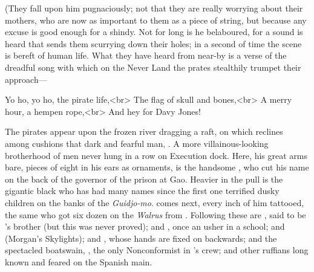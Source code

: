 \begin{stagedir}
(They fall upon him pugnaciously;
not that they are really worrying about their mothers, who are now as important to them as a piece of string,
but because any excuse is good enough for a shindy.
Not for long is he belaboured, for a sound is heard that sends them scurrying down their holes; in a second of time the scene is bereft of human life.
What they have heard from near-by is a verse of the dreadful song with which on the Never Land the prates stealthily trumpet their approach—

\begin{drama}
\speakercontinues
Yo ho, yo ho, the pirate life,<br>
The flag of skull and bones,<br>
A merry hour, a hempen rope,<br>
And hey for Davy Jones!
\end{drama}

The pirates appear upon the frozen river dragging a raft,
on which reclines among cushions that dark and fearful man, \captjashook.
A more villainous-looking brotherhood of men never hung in a row on Execution dock.
Here, his great arms bare, pieces of eight in his ears as ornaments, is the handsome \cecco, who cut his name on the back of the governor of the prison at Gao.
Heavier in the pull is the gigantic black who has had many names since the first one terrified dusky children on the banks of the \emph{Guidjo-mo}.
\billjukes comes next, every inch of him tattooed, the same \jukes who got six dozen on the \emph{Walrus} from \flint.
Following these are \cookson, said to be \blackmurphy's brother (but this was never proved);
and \gentlemanstarkey, once an usher in a school;
and \skylights (Morgan's Skylights);
and \noodler, whose hands are fixed on backwards;
and the spectacled boatswain, \smee, the only Nonconformist in \hook's crew;
and other ruffians long known and feared on the Spanish main.


\end{stagedir}
